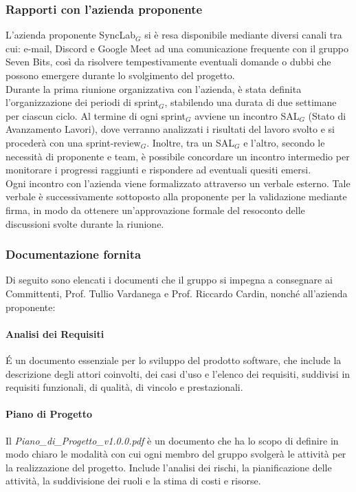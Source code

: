 \documentclass[10pt]{article}
\begin{document}
\begin{justify}
    \subsubsection{Rapporti con l'azienda proponente}
    L'azienda proponente SyncLab$_G$ si è resa disponibile mediante diversi canali tra cui: e-mail, Discord e Google Meet ad una comunicazione frequente con il gruppo Seven Bits, così da risolvere tempestivamente eventuali domande o dubbi che possono emergere durante lo svolgimento del progetto.\\
    Durante la prima riunione organizzativa con l'azienda, è stata definita l'organizzazione dei periodi di sprint$_G$, stabilendo una durata di due settimane per ciascun ciclo. Al termine di ogni sprint$_G$ avviene un incontro SAL$_G$ (Stato di Avanzamento Lavori), dove verranno analizzati i risultati del lavoro svolto e si procederà con una sprint-review$_G$. Inoltre, tra un SAL$_G$ e l'altro, secondo le necessità di proponente e team, è possibile concordare un incontro intermedio per monitorare i progressi raggiunti e rispondere ad eventuali quesiti emersi.\\
    Ogni incontro con l'azienda viene formalizzato attraverso un verbale esterno. Tale verbale è successivamente sottoposto alla proponente per la validazione mediante firma, in modo da ottenere un'approvazione formale del resoconto delle discussioni svolte durante la riunione.\\

    \subsubsection{Documentazione fornita}
    Di seguito sono elencati i documenti che il gruppo si impegna a consegnare ai Committenti, Prof. Tullio Vardanega e Prof. Riccardo Cardin, nonché all'azienda proponente:\\

        \paragraph{Analisi dei Requisiti}
        \'E un documento essenziale per lo sviluppo del prodotto software, che include la descrizione degli attori coinvolti, dei casi d'uso e l'elenco dei requisiti, suddivisi in requisiti funzionali, di qualità, di vincolo e prestazionali.\\

        \paragraph{Piano di Progetto}
        Il \textit{Piano\_di\_Progetto\_v1.0.0.pdf} è un documento che ha lo scopo di definire in modo chiaro le modalità con cui ogni membro del gruppo svolgerà le attività per la realizzazione del progetto. Include l'analisi dei rischi, la pianificazione delle attività, la suddivisione dei ruoli e la stima di costi e risorse.\\


\end{justify}
\end{document}

